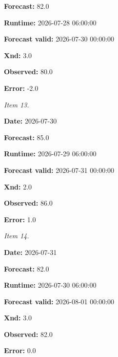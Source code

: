 \documentclass[11pt]{article}
\begin{document}
\par\noindent\textbf{Forecast:} 82.0

\par\noindent\textbf{Runtime:} 2026-07-28 06:00:00

\par\noindent\textbf{Forecast valid:} 2026-07-30 00:00:00

\par\noindent\textbf{Xnd:} 3.0

\par\noindent\textbf{Observed:} 80.0

\par\noindent\textbf{Error:} -2.0

\par\noindent\textit{Item 13.}\par \par\noindent\textbf{Date:} 2026-07-30

\par\noindent\textbf{Forecast:} 85.0

\par\noindent\textbf{Runtime:} 2026-07-29 06:00:00

\par\noindent\textbf{Forecast valid:} 2026-07-31 00:00:00

\par\noindent\textbf{Xnd:} 2.0

\par\noindent\textbf{Observed:} 86.0

\par\noindent\textbf{Error:} 1.0

\par\noindent\textit{Item 14.}\par \par\noindent\textbf{Date:} 2026-07-31

\par\noindent\textbf{Forecast:} 82.0

\par\noindent\textbf{Runtime:} 2026-07-30 06:00:00

\par\noindent\textbf{Forecast valid:} 2026-08-01 00:00:00

\par\noindent\textbf{Xnd:} 3.0

\par\noindent\textbf{Observed:} 82.0

\par\noindent\textbf{Error:} 0.0
\end{document}
